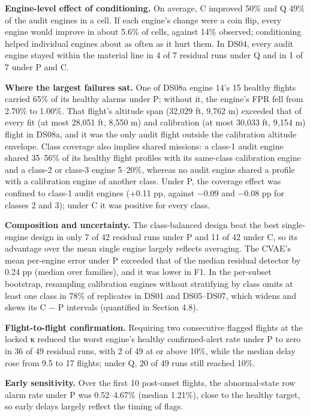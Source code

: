 \documentclass[preprint,11pt,a4paper]{elsarticle}
\begin{document}
\textbf{Engine-level effect of conditioning.} On average, C improved 50\% and Q 49\% of the audit engines in a cell. If each engine's change were a coin flip, every engine would improve in about 5.6\% of cells, against 14\% observed; conditioning helped individual engines about as often as it hurt them. In DS04, every audit engine stayed within the material line in 4 of 7 residual runs under Q and in 1 of 7 under P and C.

\textbf{Where the largest failures sat.} One of DS08a engine 14's 15 healthy flights carried 65\% of its healthy alarms under P; without it, the engine's FPR fell from 2.70\% to 1.00\%. That flight's altitude span (32,029 ft, 9,762 m) exceeded that of every fit (at most 28,051 ft, 8,550 m) and calibration (at most 30,033 ft, 9,154 m) flight in DS08a, and it was the only audit flight outside the calibration altitude envelope. Class coverage also implies shared missions: a class-1 audit engine shared 35–56\% of its healthy flight profiles with its same-class calibration engine and a class-2 or class-3 engine 5–20\%, whereas no audit engine shared a profile with a calibration engine of another class. Under P, the coverage effect was confined to class-1 audit engines (+0.11 pp, against −0.09 and −0.08 pp for classes 2 and 3); under C it was positive for every class.

\textbf{Composition and uncertainty.} The class-balanced design beat the best single-engine design in only 7 of 42 residual runs under P and 11 of 42 under C, so its advantage over the mean single engine largely reflects averaging. The CVAE's mean per-engine error under P exceeded that of the median residual detector by 0.24 pp (median over families), and it was lower in F1. In the per-subset bootstrap, resampling calibration engines without stratifying by class omits at least one class in 78\% of replicates in DS01 and DS05–DS07, which widens and skews its C − P intervals (quantified in Section 4.8).

\textbf{Flight-to-flight confirmation.} Requiring two consecutive flagged flights at the locked κ reduced the worst engine's healthy confirmed-alert rate under P to zero in 36 of 49 residual runs, with 2 of 49 at or above 10\%, while the median delay rose from 9.5 to 17 flights; under Q, 20 of 49 runs still reached 10\%.

\textbf{Early sensitivity.} Over the first 10 post-onset flights, the abnormal-state row alarm rate under P was 0.52–4.67\% (median 1.21\%), close to the healthy target, so early delays largely reflect the timing of flags.
\end{document}
